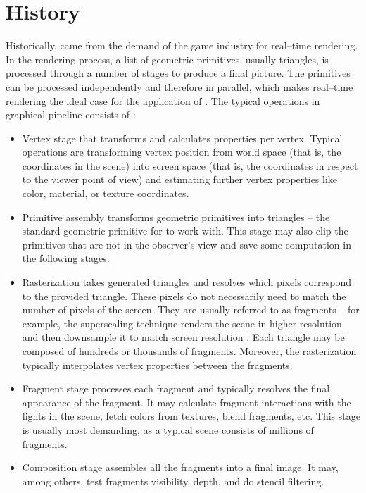 \section{History}

Historically, \gpu came from the demand of the game industry for real--time rendering. In the rendering process, a list of geometric primitives, usually triangles, is processed through a number of stages to produce a final picture. The primitives can be processed independently and therefore in parallel, which makes real--time rendering the ideal case for the application of \gpu. The typical operations in graphical pipeline consists of \citep{GPUComputingOwens}:
\begin{itemize}
    \item Vertex stage that transforms and calculates properties per vertex. Typical operations are transforming vertex position from world space (that is, the coordinates in the scene) into screen space (that is, the coordinates in respect to the viewer point of view) and estimating further vertex properties like color, material, or texture coordinates.
    \item Primitive assembly transforms geometric primitives into triangles -- the standard geometric primitive for \gpu to work with. This stage may also clip the primitives that are not in the observer's view and save some computation in the following stages.
    \item Rasterization takes generated triangles and resolves which pixels correspond to the provided triangle. These pixels do not necessarily need to match the number of pixels of the screen. They are usually referred to as fragments -- for example, the superscaling technique renders the scene in higher resolution and then downsample it to match screen resolution \citep{GameGraphicProgramming}. Each triangle may be composed of hundreds or thousands of fragments. Moreover, the rasterization typically interpolates vertex properties between the fragments.
    \item Fragment stage processes each fragment and typically resolves the final appearance of the fragment. It may calculate fragment interactions with the lights in the scene, fetch colors from textures, blend fragments, etc. This stage is usually most demanding, as a typical scene consists of millions of fragments.
    \item Composition stage assembles all the fragments into a final image. It may, among others, test fragments visibility, depth, and do stencil filtering.
\end{itemize}

